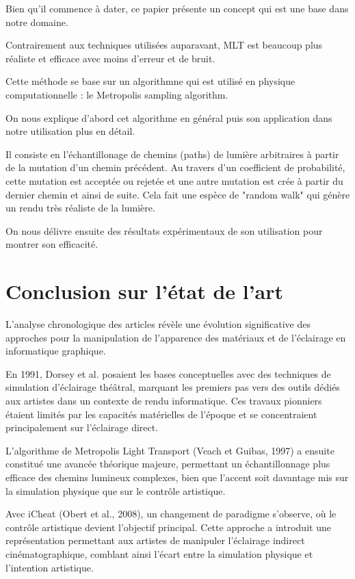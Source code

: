 \documentclass{article}
\begin{document}
Bien qu'il commence à dater, ce papier présente un concept qui est une base dans notre domaine.

Contrairement aux techniques utilisées auparavant, MLT est beaucoup plus réaliste et efficace avec moins d'erreur et de bruit.

Cette méthode se base sur un algorithmne qui est utilisé en physique computationnelle : le Metropolis sampling algorithm.

On nous explique d'abord cet algorithme en général puis son application dans notre utilisation plus en détail.

Il consiste en l'échantillonage de chemins (paths) de lumière arbitraires à partir de la mutation d'un chemin précédent. Au travers d'un coefficient de probabilité, cette mutation est acceptée ou rejetée et une autre mutation est crée à partir du dernier chemin et ainsi de suite. Cela fait une espèce de "random walk" qui génère un rendu très réaliste de la lumière.

On nous délivre ensuite des résultats expérimentaux de son utilisation pour montrer son efficacité. 

\newpage
\section{Conclusion sur l'état de l'art}

L'analyse chronologique des articles révèle une évolution significative des approches pour la manipulation de l'apparence des matériaux et de l'éclairage en informatique graphique.

En 1991, Dorsey et al. posaient les bases conceptuelles avec des techniques de simulation d'éclairage théâtral, marquant les premiers pas vers des outils dédiés aux artistes dans un contexte de rendu informatique. Ces travaux pionniers étaient limités par les capacités matérielles de l'époque et se concentraient principalement sur l'éclairage direct.

L'algorithme de Metropolis Light Transport (Veach et Guibas, 1997) a ensuite constitué une avancée théorique majeure, permettant un échantillonnage plus efficace des chemins lumineux complexes, bien que l'accent soit davantage mis sur la simulation physique que sur le contrôle artistique.

Avec iCheat (Obert et al., 2008), un changement de paradigme s'observe, où le contrôle artistique devient l'objectif principal. Cette approche a introduit une représentation permettant aux artistes de manipuler l'éclairage indirect cinématographique, comblant ainsi l'écart entre la simulation physique et l'intention artistique.
\end{document}
